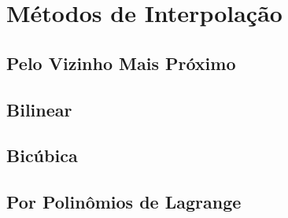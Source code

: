 \section{Métodos de Interpolação} \label{sec:interp}

\subsection{Pelo Vizinho Mais Próximo} \label{sec:interp:vizinho}

\subsection{Bilinear} \label{sec:interp:bilinear}

\subsection{Bicúbica} \label{sec:interp:bicubica}

\subsection{Por Polinômios de Lagrange} \label{sec:interp:lagrange}
